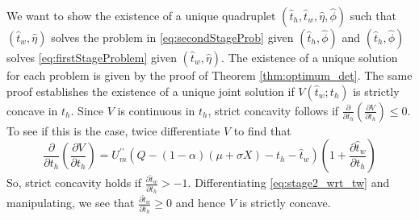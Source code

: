 \documentclass[12pt,a4paper,british]{article}
\makeatletter
\newenvironment{proof}[1][\proofname]{\par
    \normalfont\topsep6\p@\@plus6\p@\relax
    \trivlist
    \itemindent\parindent
    \item[\hskip\labelsep
          \scshape
      #1]\ignorespaces
  }{%
    \endtrivlist\@endpefalse
  }
\providecommand{\proofname}{Proof}
\makeatother
\begin{document}


\begin{proof}
We want to show the existence of a unique quadruplet $\left( \hat{t}_{h},\hat{t}_{w}, \hat{\eta},\hat{\phi}\right)$ such that $\left( \hat{t}_{w}, \hat{\eta}\right)$ solves the problem in \eqref{eq:secondStageProb} given $\left( \hat{t}_{h},\hat{\phi}\right)$ and $\left( \hat{t}_{h},\hat{\phi}\right)$ solves \eqref{eq:firstStageProblem} given $\left( \hat{t}_{w},\hat{\eta}\right)$. The existence of a unique solution for each problem is given by the proof of Theorem \ref{thm:optimum_det}. The same proof establishes the existence of a unique joint solution if $V\left(\hat{t}_{w};t_{h}\right)$ is strictly concave in $t_{h}$. Since $V$ is continuous in $t_{h}$, strict concavity follows if $\frac{\partial}{\partial t_{h}}\left(\frac{\partial V}{\partial t_{h}}\right) \leq 0$. To see if this is the case, twice differentiate $V$ to find that%
\begin{equation*}
\frac{\partial}{\partial t_{h}}\left(\frac{\partial V}{\partial t_{h}}\right) = U_{m}^{\prime\prime} \left(Q - \left(1 - \alpha\right) \left(\mu + \sigma X\right) - t_{h} - \hat{t}_{w} \right) \left( 1 + \frac{\partial\hat{t}_{w}}{\partial t_{h}}\right)
\end{equation*}
So, strict concavity holds if $\frac{\partial\hat{t}_{w}}{\partial t_{h}} > -1$. Differentiating \eqref{eq:stage2_wrt_tw} and manipulating, we see that  $\frac{\partial\hat{t}_{w}} {\partial t_{h}} \geq 0$ and hence $V$ is strictly concave. 


\end{proof}
\end{document}
